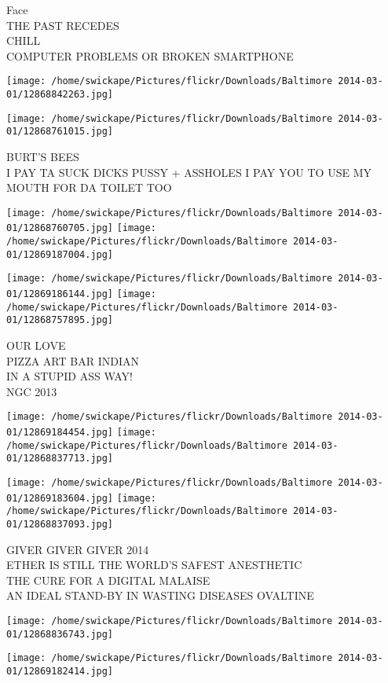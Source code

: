 \documentclass[10pt,letterpaper]{article}
\begin{document}
Face\\
THE PAST RECEDES\\
CHILL\\
COMPUTER PROBLEMS OR BROKEN SMARTPHONE
\pagebreak

\texttt{[image: /home/swickape/Pictures/flickr/Downloads/Baltimore 2014-03-01/12868842263.jpg]}

\vspace{0.25in}
\texttt{[image: /home/swickape/Pictures/flickr/Downloads/Baltimore 2014-03-01/12868761015.jpg]}

BURT'S BEES\\
I PAY TA SUCK DICKS PUSSY + ASSHOLES I PAY YOU TO USE MY MOUTH FOR DA TOILET TOO
\pagebreak

\texttt{[image: /home/swickape/Pictures/flickr/Downloads/Baltimore 2014-03-01/12868760705.jpg]}
\texttt{[image: /home/swickape/Pictures/flickr/Downloads/Baltimore 2014-03-01/12869187004.jpg]}

\texttt{[image: /home/swickape/Pictures/flickr/Downloads/Baltimore 2014-03-01/12869186144.jpg]}
\texttt{[image: /home/swickape/Pictures/flickr/Downloads/Baltimore 2014-03-01/12868757895.jpg]}

OUR LOVE\\
PIZZA ART BAR INDIAN\\
IN A STUPID ASS WAY!\\
NGC 2013
\pagebreak

\texttt{[image: /home/swickape/Pictures/flickr/Downloads/Baltimore 2014-03-01/12869184454.jpg]}
\texttt{[image: /home/swickape/Pictures/flickr/Downloads/Baltimore 2014-03-01/12868837713.jpg]}

\texttt{[image: /home/swickape/Pictures/flickr/Downloads/Baltimore 2014-03-01/12869183604.jpg]}
\texttt{[image: /home/swickape/Pictures/flickr/Downloads/Baltimore 2014-03-01/12868837093.jpg]}

GIVER GIVER GIVER 2014\\
ETHER IS STILL THE WORLD'S SAFEST ANESTHETIC\\
THE CURE FOR A DIGITAL MALAISE\\
AN IDEAL STAND{-}BY IN WASTING DISEASES OVALTINE
\pagebreak

\texttt{[image: /home/swickape/Pictures/flickr/Downloads/Baltimore 2014-03-01/12868836743.jpg]}

\vspace{0.25in}
\texttt{[image: /home/swickape/Pictures/flickr/Downloads/Baltimore 2014-03-01/12869182414.jpg]}
\end{document}
